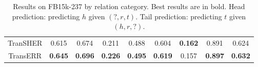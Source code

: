 \documentclass[10pt, a4paper]{article}
\begin{document}
\begin{table}[!htb]
{\begin{tabular}{ccccccccc}
				TranSHER             & 0.615                                                  & 0.674                                                  & 0.211          & 0.488          & 0.604          & \textbf{0.162}          & 0.891          & 0.624          \\
				TransERR            & \textbf{0.645}                                         & \textbf{0.696}                                         & \textbf{0.226} & \textbf{0.495} & \textbf{0.619} & 0.157 & \textbf{0.897} & \textbf{0.632} \\ \hline \hline
			\end{tabular}}
		\caption{Results on FB15k-237 by relation category.  Best results are in bold. Head prediction: predicting $h$ given $(?,r,t)$. Tail prediction: predicting $t$ given $(h,r,?)$.}
		\label{1-n}
	\end{table}
	
\end{document}
